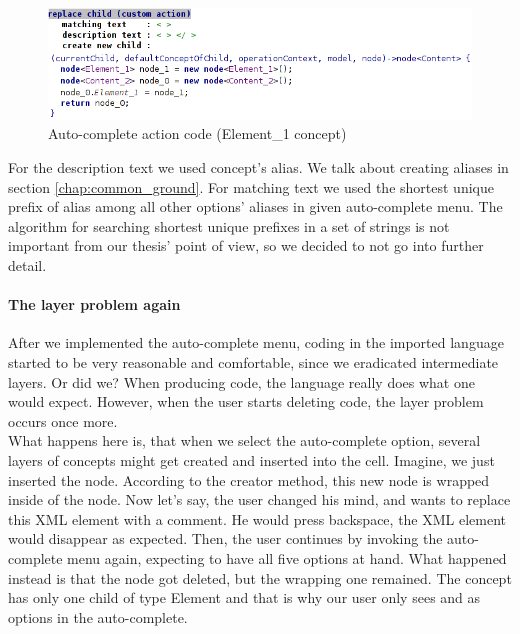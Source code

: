 \begin{figure}[h]
	\centering
	\includegraphics[width=\textwidth]{./img/autocomplete_action.png}
	\caption{Auto-complete action code (Element{\_}1 concept)}
	\label{fig:autocomplete_action}
\end{figure}

For the description text we used concept's alias.
We talk about creating aliases in section \ref{chap:common_ground}.
For matching text we used the shortest unique prefix of alias among all other options' aliases in given auto-complete menu.
The algorithm for searching shortest unique prefixes in a set of strings is not important from our thesis' point of view, so we decided to not go into further detail.


\paragraph{The layer problem again}

After we implemented the auto-complete menu, coding in the imported language started to be very reasonable and comfortable, since we eradicated intermediate layers.
Or did we?
When producing code, the language really does what one would expect.
However, when the user starts deleting code, the layer problem occurs once more.
\\

What happens here is, that when we select the auto-complete option, several layers of concepts might get created and inserted into the cell.
Imagine, we just inserted the  node.
According to the creator method, this new node is wrapped inside of the  node.
Now let's say, the user changed his mind, and wants to replace this XML element with a comment.
He would press backspace, the XML element would disappear as expected.
Then, the user continues by invoking the auto-complete menu again, expecting to have all five options at hand.
What happened instead is that the  node got deleted, but the wrapping  one remained.
The  concept has only one child of type Element and that is why our user only sees  and  as options in the auto-complete.


